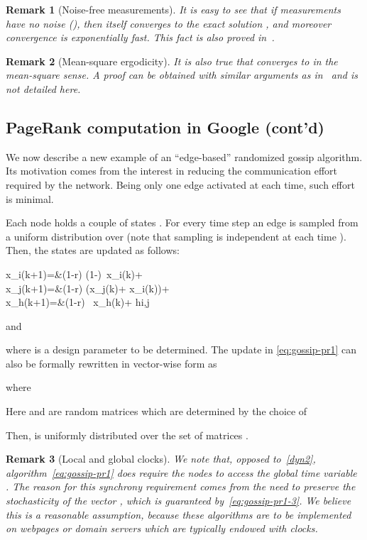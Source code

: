 \documentclass{IEEEtran}
\newtheorem{remark}{Remark}
\newcommand{\1}{\mathbf{1}} \newcommand{\ind}{\mathds{1}}
\begin{document}
\begin{remark}[Noise-free measurements]\label{rem:noise-free-localization}
It is easy to see that if measurements have no noise (), then  itself converges to the exact solution , and moreover convergence is exponentially fast. This fact is also proved in~\cite{NMF-AZ:12}.
\end{remark}

\begin{remark}[Mean-square ergodicity]
It is also true that  converges to  in the mean-square sense. 
A proof can be obtained with similar arguments as in~\cite{CR-PF-HI-RT:13a} and is not detailed here.
\end{remark}

\subsection{PageRank computation in Google (cont'd)}\label{sect:random-pagerank}




We now describe a new example of an ``edge-based'' randomized gossip algorithm. Its motivation comes from the interest in reducing the communication effort required by the network. Being only one edge activated at each time, such effort is minimal. 

Each node  holds a couple of states . For every time step  an edge  is sampled from a uniform distribution over  (note that sampling is independent at each time ).
Then, the states are updated as follows:
 
x_i(k+1)=&(1-r) \left(1-\right)\, x_i(k)+ \\
x_j(k+1)=&(1-r) \left(x_j(k)+ x_i(k)\right)+ \\
x_h(k+1)=&(1-r) \, x_h(k)+  \qquad {}\; h\neq i,j \label{eq:gossip-pr1-3}

and

where  is a design parameter to be determined.
The update in \eqref{eq:gossip-pr1} can also be formally rewritten in vector-wise form as

where 
 
Here  and  are random matrices which are determined by the choice of 

Then,  is uniformly distributed over the set of matrices .

\begin{remark}[Local and global clocks]
We note that, opposed to~\eqref{dyn2}, algorithm~\eqref{eq:gossip-pr1} does require the nodes to access the global time variable . The reason for this synchrony requirement comes from the need to preserve the stochasticity of the vector , which is guaranteed by~\eqref{eq:gossip-pr1-3}. We believe this is a reasonable assumption, because these algorithms are to be implemented on webpages or domain servers which are typically endowed with clocks.
\end{remark}
\end{document}
